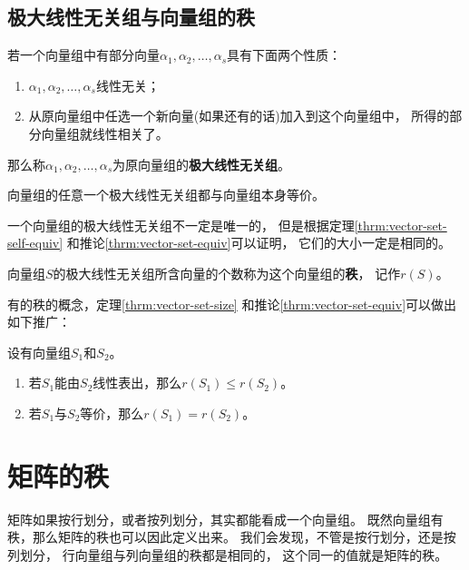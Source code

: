 \subsection{极大线性无关组与向量组的秩}
\begin{definition}
  若一个向量组中有部分向量$\alpha_1,\alpha_2,\dots,\alpha_s$具有下面两个性质：
  \begin{enumerate}
    \item
    $\alpha_1,\alpha_2,\dots,\alpha_s$线性无关；
    \item
    从原向量组中任选一个新向量(如果还有的话)加入到这个向量组中，
    所得的部分向量组就线性相关了。
  \end{enumerate}
  那么称$\alpha_1,\alpha_2,\dots,\alpha_s$为原向量组的\textbf{极大线性无关组}。
\end{definition}

\begin{theorem} \label{thrm:vector-set-self-equiv}
   向量组的任意一个极大线性无关组都与向量组本身等价。
\end{theorem}

\begin{remark}
  一个向量组的极大线性无关组不一定是唯一的，
  但是根据定理\ref{thrm:vector-set-self-equiv}
  和推论\ref{thrm:vector-set-equiv}可以证明，
  它们的大小一定是相同的。
\end{remark}

\begin{definition}[向量组的秩]
  向量组$S$的极大线性无关组所含向量的个数称为这个向量组的\textbf{秩}，
  记作$r(S)$。
\end{definition}

有的秩的概念，定理\ref{thrm:vector-set-size}
和推论\ref{thrm:vector-set-equiv}可以做出如下推广：
\begin{theorem}
  设有向量组$S_1$和$S_2$。
  \begin{enumerate}
    \item
    若$S_1$能由$S_2$线性表出，那么$r(S_1) \le r(S_2)$。
    \item
    若$S_1$与$S_2$等价，那么$r(S_1)=r(S_2)$。
  \end{enumerate}
\end{theorem}

\section{矩阵的秩}
矩阵如果按行划分，或者按列划分，其实都能看成一个向量组。
既然向量组有秩，那么矩阵的秩也可以因此定义出来。
我们会发现，不管是按行划分，还是按列划分，
行向量组与列向量组的秩都是相同的，
这个同一的值就是矩阵的秩。

